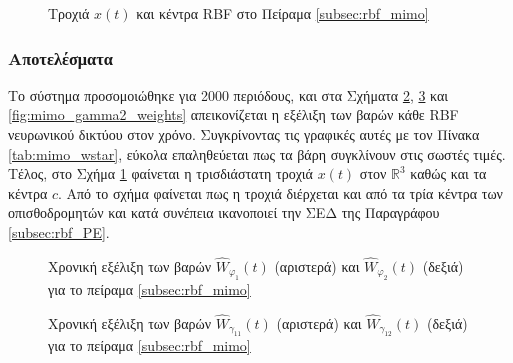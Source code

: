{
\begin{figure}
	
	\captionsetup{format=plain}
	\caption{Τροχιά $x(t)$ και κέντρα RBF στο Πείραμα \ref{subsec:rbf_mimo}}
	\label{fig:phase_plain_mimo}	
\end{figure}
\subsubsection{Αποτελέσματα}
Το σύστημα προσομοιώθηκε για 2000 περιόδους, και στα Σχήματα \ref{fig:mimo_phi_weights}, \ref{fig:mimo_gamma1_weights} και \ref{fig:mimo_gamma2_weights} απεικονίζεται η εξέλιξη των βαρών κάθε RBF νευρωνικού δικτύου στον χρόνο. Συγκρίνοντας τις γραφικές αυτές με τον Πίνακα \ref{tab:mimo_wstar}, εύκολα επαληθεύεται πως τα βάρη συγκλίνουν στις σωστές τιμές. Τέλος, στο Σχήμα \ref{fig:phase_plain_mimo} φαίνεται η τρισδιάστατη τροχιά $x(t)$ στον $\mathbb{R}^3$ καθώς και τα κέντρα $c$. Από το σχήμα φαίνεται πως η τροχιά διέρχεται και από τα τρία κέντρα των οπισθοδρομητών και κατά συνέπεια ικανοποιεί την ΣΕΔ της Παραγράφου \ref{subsec:rbf_PE}.

}

\begin{figure}
	\begin{subfigure}{0.5\textwidth}
		
	\end{subfigure}
	\begin{subfigure}{0.5\textwidth}
		
	\end{subfigure}
	\caption{ Χρονική εξέλιξη των βαρών $\hat{W}_{\varphi_1}(t)$ (αριστερά) και $\hat{W}_{\varphi_2}(t)$ (δεξιά) για το πείραμα \ref{subsec:rbf_mimo}}
	\label{fig:mimo_phi_weights}
\end{figure}

\begin{figure}
	\begin{subfigure}{0.5\textwidth}
		
	\end{subfigure}
	\begin{subfigure}{0.5\textwidth}
		
	\end{subfigure}
	\caption{ Χρονική εξέλιξη των βαρών $\hat{W}_{\gamma_{11}}(t)$ (αριστερά) και $\hat{W}_{\gamma_{12}}(t)$ (δεξιά) για το πείραμα \ref{subsec:rbf_mimo}}
		\label{fig:mimo_gamma1_weights}
	\end{figure}


